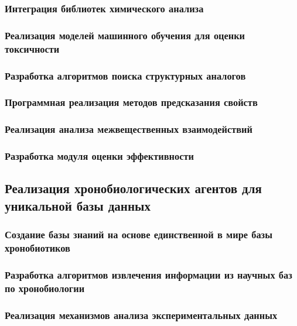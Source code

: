 \documentclass{syksu-coursework}
\begin{document}
\subsubsection{Интеграция библиотек химического анализа}

\subsubsection{Реализация моделей машинного обучения для оценки токсичности}

\subsubsection{Разработка алгоритмов поиска структурных аналогов}

\subsubsection{Программная реализация методов предсказания свойств}

\subsubsection{Реализация анализа межвещественных взаимодействий}

\subsubsection{Разработка модуля оценки эффективности}

\subsection{Реализация хронобиологических агентов для уникальной базы данных}

\subsubsection{Создание базы знаний на основе единственной в мире базы хронобиотиков}

\subsubsection{Разработка алгоритмов извлечения информации из научных баз по хронобиологии}

\subsubsection{Реализация механизмов анализа экспериментальных данных}
\end{document}
